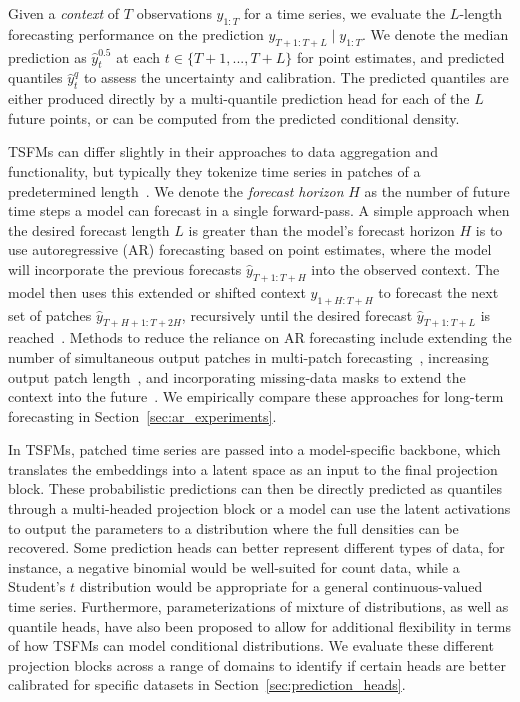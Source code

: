 \documentclass{article}
\begin{document}
Given a {\it context} of $T$ observations $y_{1:T}$ for a time series, we evaluate the $L$-length forecasting performance on the prediction $y_{T+1: T+L} \mid y_{1:T}$. 
We denote the median prediction as $\hat{y}_{t}^{0.5}$ at each $t \in \{T+1,..., T+L\}$ for point estimates, and predicted quantiles $\hat{y}^q_{t}$ to assess the uncertainty and calibration. 
The predicted quantiles are either produced directly by a multi-quantile prediction head for each of the $L$ future points, or can be computed from the predicted conditional density.

TSFMs can differ slightly in their approaches to data aggregation and functionality, but typically they tokenize time series in patches of a predetermined length~\citep{patchtst}. 
We denote the \textit{forecast horizon} $H$ as the number of future time steps a model can forecast in a single forward-pass.
A simple approach when the desired forecast length $L$ is greater than the model's forecast horizon $H$ is to use autoregressive (AR) forecasting based on point estimates, where the model will incorporate the previous forecasts $\hat{y}_{T+1:T+H}$ into the observed context.
The model then uses this extended or shifted context $y_{1+H:T+H}$ to forecast the next set of patches $\hat{y}_{T+H+1:T+2H}$, recursively until the desired forecast $\hat{y}_{T+1:T+L}$ is reached~\citep{chronos-bolt,toto}.
Methods to reduce the reliance on AR forecasting include extending the number of simultaneous output patches in multi-patch forecasting~\citep{moirai}, increasing output patch length~\citep{timesfm}, and incorporating missing-data masks to extend the context into the future~\citep{tirex}.
We empirically compare these approaches for long-term forecasting in Section~\ref{sec:ar_experiments}.

In TSFMs, patched time series are passed into a model-specific backbone, which translates the embeddings into a latent space as an input to the final projection block.
These probabilistic predictions can then be directly predicted as quantiles through a multi-headed projection block or a model can use the latent activations to output the parameters to a distribution where the full densities can be recovered.
Some prediction heads can better represent different types of data, for instance, a negative binomial would be well-suited for count data, while a Student's $t$ distribution would be appropriate for a general continuous-valued time series.
Furthermore, parameterizations of mixture of distributions, as well as quantile heads, have also been proposed \citep{moirai,timesfm,toto} to allow for additional flexibility in terms of how TSFMs can model conditional distributions.
We evaluate these different projection blocks across a range of domains to identify if certain heads are better calibrated for specific datasets in Section~\ref{sec:prediction_heads}.
\end{document}
